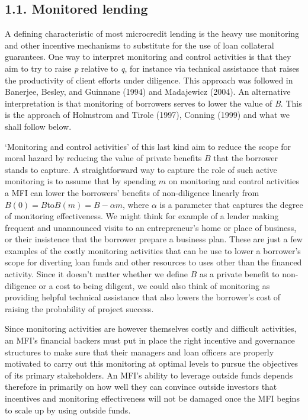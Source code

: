 \documentclass{article} %
\begin{document}
\noindent 
\subsection{1.1.  Monitored lending}

A defining characteristic of most microcredit lending is the heavy use monitoring and other incentive mechanisms to substitute for the use of loan collateral guarantees.  One way to interpret monitoring and control activities is that they aim to try to raise \textit{p }relative to \textit{q}, for instance via technical assistance that raises the productivity of client efforts under diligence.  This approach was followed in Banerjee, Besley, and Guinnane (1994) and Madajewicz (2004).  An alternative interpretation is that monitoring of borrowers serves to lower the value of \textit{B}.  This is the approach of Holmstrom and Tirole (1997), Conning (1999) and what we shall follow below. 

`Monitoring and control activities' of this last kind aim to reduce the scope for moral hazard by reducing the value of private benefits $B$ that the borrower stands to capture.  A straightforward way to capture the role of such active monitoring is to assume that by spending $m$ on monitoring and control activities a MFI can lower the borrowers' benefits of non-diligence linearly from $B(0)=B$to$B(m)=B-\alpha m$, where $\alpha $ is a parameter that captures the degree of monitoring effectiveness.  We might think for example of a lender making frequent and unannounced visits to an entrepreneur's home or place of business, or their insistence that the borrower prepare a business plan.  These are just a few examples of the costly monitoring activities that can be use to lower a borrower's scope for diverting loan funds and other resources to uses other than the financed activity.  Since it doesn't matter whether we define $B$ as a private benefit to non-diligence or a cost to being diligent, we could also think of monitoring as providing helpful technical assistance that also lowers the borrower's cost of raising the probability of project success. 

Since monitoring activities are however themselves costly and difficult activities, an MFI's financial backers must put in place the right incentive and governance structures to make sure that their managers and loan officers are properly motivated to carry out this monitoring at optimal levels to pursue the objectives of its primary stakeholders.  An MFI's ability to leverage outside funds depends therefore in primarily on how well they can convince outside investors that incentives and monitoring effectiveness will not be damaged once the MFI begins to scale up by using outside funds. 
\end{document}
